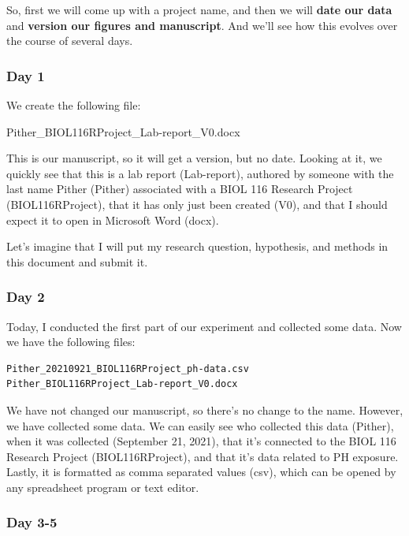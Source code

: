 \documentclass[
]{book}
\begin{document}
So, first we will come up with a project name, and then we will \textbf{date our data} and \textbf{version our figures and manuscript}. And we'll see how this evolves over the course of several days.

\hypertarget{day-1}{%
\subsubsection*{Day 1}\label{day-1}}

We create the following file:

Pither\_BIOL116RProject\_Lab-report\_V0.docx

This is our manuscript, so it will get a version, but no date. Looking at it, we quickly see that this is a lab report (Lab-report), authored by someone with the last name Pither (Pither) associated with a BIOL 116 Research Project (BIOL116RProject), that it has only just been created (V0), and that I should expect it to open in Microsoft Word (docx).

Let's imagine that I will put my research question, hypothesis, and methods in this document and submit it.

\hypertarget{day-2}{%
\subsubsection*{Day 2}\label{day-2}}

Today, I conducted the first part of our experiment and collected some data. Now we have the following files:

\begin{verbatim}
Pither_20210921_BIOL116RProject_ph-data.csv
Pither_BIOL116RProject_Lab-report_V0.docx
\end{verbatim}

We have not changed our manuscript, so there's no change to the name. However, we have collected some data. We can easily see who collected this data (Pither), when it was collected (September 21, 2021), that it's connected to the BIOL 116 Research Project (BIOL116RProject), and that it's data related to PH exposure. Lastly, it is formatted as comma separated values (csv), which can be opened by any spreadsheet program or text editor.

\hypertarget{day-3-5}{%
\subsubsection*{Day 3-5}\label{day-3-5}}
\end{document}

